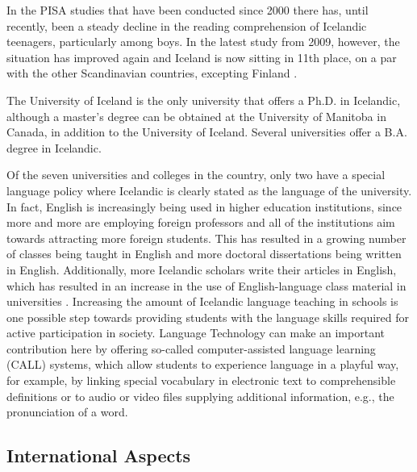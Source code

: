 \begin{multicols}{2}
In the PISA studies that have been conducted since 2000 there has, until recently, been a steady decline in the reading comprehension of Icelandic teenagers, particularly among boys. In the latest study from 2009, however, the situation has improved again and Iceland is now sitting in 11th place, on a par with the other Scandinavian countries, excepting Finland \cite{nam1}. 

The University of Iceland is the only university that offers a Ph.D. in Icelandic, although a master’s degree can be obtained at the University of Manitoba in Canada, in addition to the University of Iceland. Several universities offer a B.A. degree in Icelandic.

Of the seven universities and colleges in the country, only two have a special language policy where Icelandic is clearly stated as the language of the university. In fact, English is increasingly being used in higher education institutions, since more and more are employing foreign professors and all of the institutions aim towards attracting more foreign students. This has resulted in a growing number of classes being taught in English and more doctoral dissertations being written in English. Additionally, more Icelandic scholars write their articles in English, which has resulted in an increase in the use of English-language class material in universities \cite{isl1}. 
Increasing the amount of Icelandic language teaching in schools is one possible step towards providing students with the language skills required for active participation in society. Language Technology can make an important contribution here by offering so-called computer-assisted language learning (CALL) systems, which allow students to experience language in a playful way, for example, by linking special vocabulary in electronic text to comprehensible definitions or to audio or video files supplying additional information, e.g., the pronunciation of a word.

\subsection{International Aspects}


\end{multicols}
